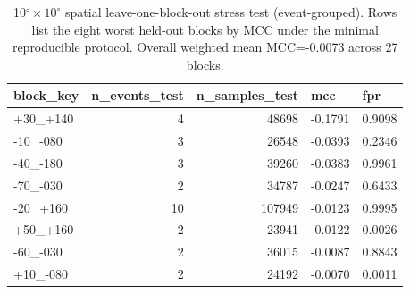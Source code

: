 \begin{table}
\caption{10$^\circ\times10^\circ$ spatial leave-one-block-out stress test (event-grouped). Rows list the eight worst held-out blocks by MCC under the minimal reproducible protocol. Overall weighted mean MCC=-0.0073 across 27 blocks.}
\label{tab:tableS11}
\begin{tabular}{lrrll}
\toprule
block\_key & n\_events\_test & n\_samples\_test & mcc & fpr \\
\midrule
+30\_+140 & 4 & 48698 & -0.1791 & 0.9098 \\
-10\_-080 & 3 & 26548 & -0.0393 & 0.2346 \\
-40\_-180 & 3 & 39260 & -0.0383 & 0.9961 \\
-70\_-030 & 2 & 34787 & -0.0247 & 0.6433 \\
-20\_+160 & 10 & 107949 & -0.0123 & 0.9995 \\
+50\_+160 & 2 & 23941 & -0.0122 & 0.0026 \\
-60\_-030 & 2 & 36015 & -0.0087 & 0.8843 \\
+10\_-080 & 2 & 24192 & -0.0070 & 0.0011 \\
\bottomrule
\end{tabular}
\end{table}
